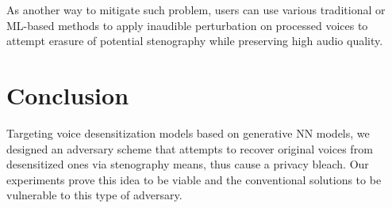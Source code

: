 \documentclass[journal]{IEEEtran} %
\begin{document}
\begin{CJK*}{UTF8}{gbsn}
As another way to mitigate such problem, users can use various traditional or ML-based methods to apply inaudible perturbation on processed voices to attempt erasure of potential stenography while preserving high audio quality.

\section{Conclusion}

Targeting voice desensitization models based on generative NN models, we designed an adversary scheme that attempts to recover original voices from desensitized ones via stenography means, thus cause a privacy bleach. Our experiments prove this idea to be viable and the conventional solutions to be vulnerable to this type of adversary.

\end{CJK*}
\end{document}
